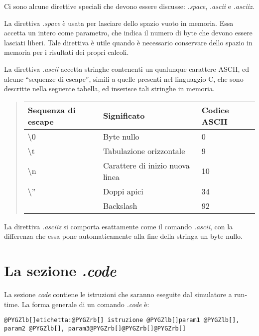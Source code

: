 \documentclass[letterpaper,10pt,italian]{sphinxmanual}
\begin{document}
Ci sono alcune direttive speciali che devono essere discusse: \emph{.space},
\emph{.ascii} e \emph{.asciiz}.

La direttiva \emph{.space} è usata per lasciare dello spazio vuoto in memoria.
Essa accetta un intero come parametro, che indica il numero di byte che devono
essere lasciati liberi.  Tale direttiva è utile quando è necessario conservare
dello spazio in memoria per i risultati dei propri calcoli.

La direttiva \emph{.ascii} accetta stringhe contenenti un qualunque carattere
ASCII, ed alcune ``sequenze di escape'', simili a quelle presenti nel linguaggio
C, che sono descritte nella seguente tabella, ed inserisce tali stringhe in
memoria.
\begin{quote}

\begin{tabulary}{\linewidth}{|L|L|L|}
\hline
\textbf{
Sequenza di escape
} & \textbf{
Significato
} & \textbf{
Codice ASCII
}\\
\hline

\textbackslash{}0
 & 
Byte nullo
 & 
0
\\

\textbackslash{}t
 & 
Tabulazione orizzontale
 & 
9
\\

\textbackslash{}n
 & 
Carattere di inizio nuova linea
 & 
10
\\

\textbackslash{}''
 & 
Doppi apici
 & 
34
\\
 & 
Backslash
 & 
92
\\
\hline
\end{tabulary}

\end{quote}

La direttiva \emph{.asciiz} si comporta esattamente come il comando \emph{.ascii}, con
la differenza che essa pone automaticamente alla fine della stringa un byte
nullo.


\section{La sezione \emph{.code}}
\label{source-files-format:la-sezione-code}
La sezione \emph{code} contiene le istruzioni che saranno eseguite dal
simulatore a run-time. La forma generale di un comando \emph{.code} è:

\begin{Verbatim}[commandchars=@\[\]]
@PYGZlb[]etichetta:@PYGZrb[] istruzione @PYGZlb[]param1 @PYGZlb[], param2 @PYGZlb[], param3@PYGZrb[]@PYGZrb[]@PYGZrb[]
\end{Verbatim}
\end{document}
